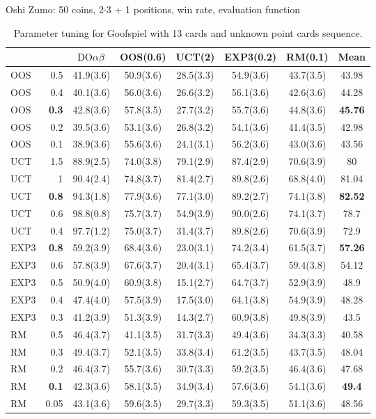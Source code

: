 \begin{table}
\begin{scriptsize}
Oshi Zumo: 50 coins, 2$\cdot$3 + 1 positions, win rate, evaluation function
\begin{tabular}{|lr|ccccc|c|}\hline
&&$\textrm{DO}\alpha\beta$&OOS(0.6)&UCT(2)&EXP3(0.2)&RM(0.1)&Mean\\\hline
OOS&0.5&41.9(3.6)&50.9(3.6)&28.5(3.3)&54.9(3.6)&43.7(3.5)&43.98\\
OOS&0.4&40.1(3.6)&56.0(3.6)&26.6(3.2)&56.1(3.6)&42.6(3.6)&44.28\\
OOS&\textbf{0.3}&42.8(3.6)&57.8(3.5)&27.7(3.2)&55.7(3.6)&44.8(3.6)&\textbf{45.76}\\
OOS&0.2&39.5(3.6)&53.1(3.6)&26.8(3.2)&54.1(3.6)&41.4(3.5)&42.98\\
OOS&0.1&38.9(3.6)&55.6(3.6)&24.1(3.1)&56.2(3.6)&43.0(3.6)&43.56\\
UCT&1.5&88.9(2.5)&74.0(3.8)&79.1(2.9)&87.4(2.9)&70.6(3.9)&80\\
UCT&1&90.4(2.4)&74.8(3.7)&81.4(2.7)&89.8(2.6)&68.8(4.0)&81.04\\
UCT&\textbf{0.8}&94.3(1.8)&77.9(3.6)&77.1(3.0)&89.2(2.7)&74.1(3.8)&\textbf{82.52}\\
UCT&0.6&98.8(0.8)&75.7(3.7)&54.9(3.9)&90.0(2.6)&74.1(3.7)&78.7\\
UCT&0.4&97.7(1.2)&75.0(3.7)&31.4(3.7)&89.8(2.6)&70.6(3.9)&72.9\\
EXP3&\textbf{0.8}&59.2(3.9)&68.4(3.6)&23.0(3.1)&74.2(3.4)&61.5(3.7)&\textbf{57.26}\\
EXP3&0.6&57.8(3.9)&67.6(3.7)&20.4(3.1)&65.4(3.7)&59.4(3.8)&54.12\\
EXP3&0.5&50.9(4.0)&60.9(3.8)&15.1(2.7)&64.7(3.7)&52.9(3.9)&48.9\\
EXP3&0.4&47.4(4.0)&57.5(3.9)&17.5(3.0)&64.1(3.8)&54.9(3.9)&48.28\\
EXP3&0.3&41.2(3.9)&51.3(3.9)&14.3(2.7)&60.9(3.8)&49.8(3.9)&43.5\\
RM&0.5&46.4(3.7)&41.1(3.5)&31.7(3.3)&49.4(3.6)&34.3(3.3)&40.58\\
RM&0.3&49.4(3.7)&52.1(3.5)&33.8(3.4)&61.2(3.5)&43.7(3.5)&48.04\\
RM&0.2&46.4(3.7)&55.7(3.6)&30.7(3.3)&59.2(3.5)&46.4(3.6)&47.68\\
RM&\textbf{0.1}&42.3(3.6)&58.1(3.5)&34.9(3.4)&57.6(3.6)&54.1(3.6)&\textbf{49.4}\\
RM&0.05&43.1(3.6)&59.6(3.5)&29.7(3.3)&59.3(3.5)&51.1(3.6)&48.56\\
\hline
\end{tabular}

\end{scriptsize}
\caption{Parameter tuning for Goofspiel with 13 cards and unknown point cards sequence.}\label{fig:tuning}
\end{table}

